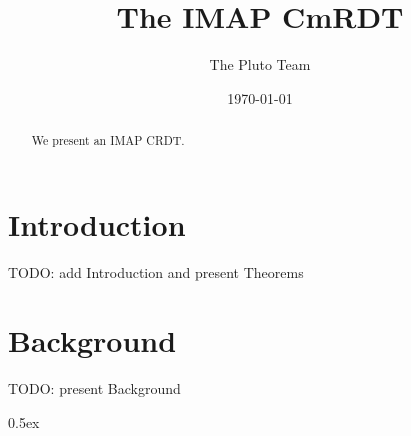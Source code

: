 \documentclass[11pt,a4paper, DIV=11]{article}
\begin{document}
\title{The IMAP CmRDT}
\author{The Pluto Team}
\date{\today}
\maketitle

\begin{abstract}
  We present an IMAP CRDT.
\end{abstract}

\tableofcontents
\newpage

\section{Introduction}

TODO: add Introduction and present Theorems

\section{Background}

TODO: present Background \cite{shapiro_crdt}

\parindent 0pt\parskip 0.5ex





\end{document}
